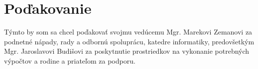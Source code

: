 \chapter{Poďakovanie}
\vfil
Týmto by som sa chcel poďakovať svojmu vedúcemu Mgr. Marekovi Zemanovi za podnetné nápady, rady a odbornú spoluprácu, katedre informatiky, predovšetkým Mgr. Jaroslavovi Budišovi za poskytnutie prostriedkov na vykonanie potrebných výpočtov a rodine a priateľom za podporu.
